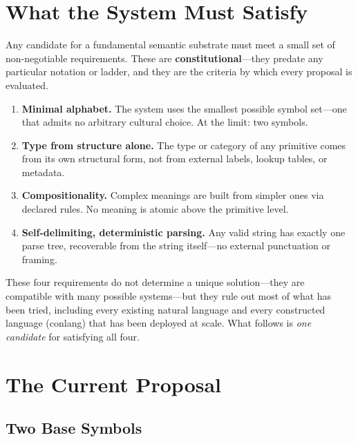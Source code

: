 \documentclass[12pt]{article}
\begin{document}
\section{What the System Must Satisfy}
\label{sec:requirements}

Any candidate for a fundamental semantic substrate must meet a small set of non-negotiable requirements. These are \textbf{constitutional}---they predate any particular notation or ladder, and they are the criteria by which every proposal is evaluated.

\begin{enumerate}[leftmargin=*, itemsep=0.4em]
    \item \textbf{Minimal alphabet.} The system uses the smallest possible symbol set---one that admits no arbitrary cultural choice. At the limit: two symbols.
    \item \textbf{Type from structure alone.} The type or category of any primitive comes from its own structural form, not from external labels, lookup tables, or metadata.
    \item \textbf{Compositionality.} Complex meanings are built from simpler ones via declared rules. No meaning is atomic above the primitive level.
    \item \textbf{Self-delimiting, deterministic parsing.} Any valid string has exactly one parse tree, recoverable from the string itself---no external punctuation or framing.
\end{enumerate}

These four requirements do not determine a unique solution---they are compatible with many possible systems---but they rule out most of what has been tried, including every existing natural language and every constructed language (conlang) that has been deployed at scale. What follows is \emph{one candidate} for satisfying all four.

\section{The Current Proposal}
\label{sec:proposal}

\subsection{Two Base Symbols}
\label{subsec:symbols}
\end{document}
